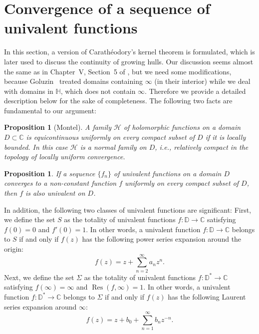 \documentclass[preprint,12pt]{elsarticle}
\newtheorem{prop}[thm]{Proposition}
\theoremstyle{definition}
\newcommand{\C}{\mathbb{C}}
\newcommand{\disk}{\mathbb{D}}
\newcommand{\uhp}{\mathbb{H}}
\DeclareMathOperator{\res}{Res}
\begin{document}
\section{Convergence of a sequence of univalent functions}
\label{subsec:kernel}

In this section, a version of Carath\'eodory's kernel theorem is formulated,
which is later used to discuss the continuity of growing hulls.
Our discussion seems almost the same as in Chapter~V, Section~5 of \cite{Go69},
but we need some modifications, because Goluzin~\cite{Go69} treated domains
containing $\infty$ (in their interior) while we deal with domains in $\uhp$,
which does not contain $\infty$.
Therefore we provide a detailed description below for the sake of completeness.
The following two facts are fundamental to our argument:

\begin{prop}[Montel] \label{prop:Montel}
A family $\mathcal{H}$ of holomorphic functions on a domain $D \subset \C$
is equicontinuous uniformly on every compact subset of $D$
if it is locally bounded.
In this case $\mathcal{H}$ is a normal family on $D$, i.e.,
relatively compact in the topology of locally uniform convergence.
\end{prop}

\begin{prop} \label{prop:univlim}
If a sequence $\{f_n\}$ of univalent functions on a domain $D$ converges
to a non-constant function $f$ uniformly on every compact subset of $D$,
then $f$ is also univalent on $D$.
\end{prop}

In addition, the following two classes of univalent functions are significant:
First, we define the set $S$ as the totality of univalent functions
$f \colon \disk \to \C$ satisfying $f(0)=0$ and $f'(0)=1$.
In other words, a univalent function $f \colon \disk \to \C$ belongs to $S$
if and only if $f(z)$ has the following power series expansion around the origin:
\begin{equation} \label{eq:classS}
f(z)=z+\sum_{n=2}^{\infty}a_n z^n.
\end{equation}
Next, we define the set $\Sigma$ as the totality of univalent functions
$f \colon \disk^* \to \C$ satisfying $f(\infty)=\infty$
and $\res(f, \infty)=1$.
In other words, a univalent function $f \colon \disk^* \to \C$
belongs to $\Sigma$ if and only if $f(z)$ has the following Laurent series expansion
around $\infty$:
\begin{equation} \label{eq:classSigma}
f(z)=z+b_0+\sum_{n=1}^{\infty}b_n z^{-n}.
\end{equation}
\end{document}
